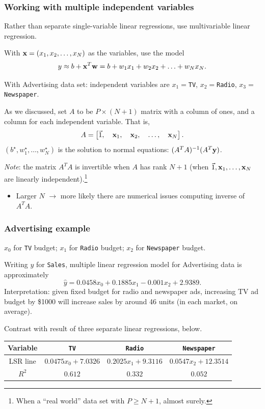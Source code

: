 \documentclass{beamer}
\theoremstyle{example}
\newcommand{\ttt}[1]{{\small\texttt{#1}}}
\begin{document}
\begin{frame}
\frametitle{Working with multiple independent variables}
    Rather than separate single-variable linear regressions, use multivariable linear regression. 
\pause

    With ${\bf x} = (x_1,x_2,\ldots,x_{N})$ as the variables, use the model 
    \[y \approx b + {\bf x}^T{\bf w} = b + w_1x_1 + w_2x_2 + \ldots + w_{N}x_{N}.\]

    \pause
    With Advertising data set: independent variables are $x_1=$\ttt{TV}, $x_2=$\ttt{Radio}, $x_3=$\ttt{Newspaper}.

    \pause 
    As we discussed, set $A$ to be $P\times(N+1)$ matrix with a column of ones, and a column for each independent variable. That is, 
        \[A = \left[\vec{1}, \quad{\bf x}_1, \quad{\bf x}_2, \quad\ldots, \quad{\bf x}_{N}\right].\]
    $(b^\star, w_1^\star, \ldots, w_N^\star)$ is the solution to normal equations: $(A^TA)^{-1}(A^T{\bf y})$.

    \emph{Note}: the matrix $A^TA$ is invertible when $A$ has rank $N+1$ (when $\vec{1}, {\bf x}_1, \ldots, {\bf x}_N$ are linearly independent).\footnote{When a ``real world'' data set with $P\ge N+1$, almost surely.} 

    \pause
    \begin{itemize}
        \item Larger $N$ $\to$ more likely there are numerical issues computing inverse of $A^TA$.
    \end{itemize}
\end{frame}

\begin{frame}
    \frametitle{Advertising example}
    $x_0$ for \ttt{TV} budget; \quad $x_1$ for \ttt{Radio} budget; \quad $x_2$ for \ttt{Newspaper} budget.
    
    \pause
    Writing $y$ for \ttt{Sales}, multiple linear regression model for Advertising data is approximately 
        \[\hat{y} = 0.0458x_0 + 0.1885x_1 - 0.001x_2 + 2.9389.\]
    \pause
    Interpretation: given fixed budget for radio and newspaper ads, increasing TV ad budget by \$1000 will increase sales by around 46 units (in each market, on average).

    \pause
    Contrast with result of three separate linear regressions, below.
    
    \begin{center}
        \begin{tabular}{c ||c|c|c}
            Variable & \ttt{TV} & \ttt{Radio} & \ttt{Newspaper} \\ 
            \hline 
            LSR line    &  {\footnotesize$0.0475x_0 + 7.0326$} & {\footnotesize$0.2025x_1 + 9.3116$} & {\footnotesize$0.0547x_2 + 12.3514$} \\
            \hline 
            $R^2$       &  {\footnotesize$0.612$}  &  {\footnotesize$0.332$}  &  {\footnotesize$0.052$}
        \end{tabular}
    \end{center}
\end{frame}
\end{document}
